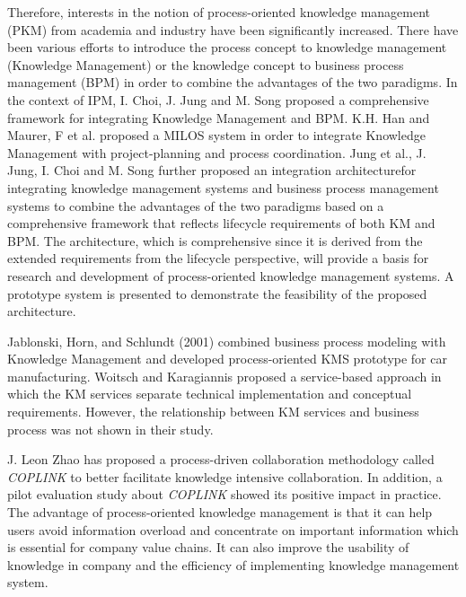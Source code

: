 \documentclass{elsarticle}
\begin{document}
\textrm{Therefore, interests in the notion of process-oriented knowledge
management (PKM) from academia and industry have been significantly
}\textrm{{increased}}\cite{jung2007integration}\textrm{.
There have been various efforts to introduce the process concept to
knowledge management (Knowledge Management) or the knowledge concept to
business process management (BPM) in order to combine the advantages of
the two
paradigms}\cite{berztiss2000knowledge,maurer98concept,maurer1999process,choi2004integrated}. In
the context of IPM, I. Choi, J. Jung and M. Song
proposed a comprehensive framework for
integrating Knowledge Management and
BPM\cite{choi2004integrated}.
\textrm{K.H. Han and }\textrm{{Maurer, F }}\textrm{et
al. proposed a MILOS system in order to integrate Knowledge Management
with project-planning and process
coordination}\cite{maurer2000merging}.
\textrm{Jung et al., J. Jung, I. Choi and M. Song further proposed an
}\textrm{{integration architecture}}for integrating knowledge
management systems  and business process management systems
 to combine the advantages of the two paradigms based on a
comprehensive framework that reflects lifecycle requirements of both
KM and BPM. The architecture, which is comprehensive
since it is derived from the extended requirements from the lifecycle
perspective, will provide a basis for research and development of
process-oriented knowledge management systems. A prototype system is
presented to demonstrate the feasibility of the proposed
architecture\cite{jung2007integration}.


\textrm{Jablonski, Horn, and Schlundt (2001) combined business process
modeling with Knowledge Management and developed process-oriented KMS
prototype for car
manufacturing}\cite{jablonski-process}.\textrm{{
}}\textrm{Woitsch and Karagiannis proposed a service-based
approach in which the KM services separate technical
implementation and conceptual requirements. However, the
}\textrm{relationship between KM services and
business process was not shown in their
study}\cite{woitsch2005process}.


\textrm{J. Leon Zhao has proposed a process-driven collaboration
methodology called }\textrm{\textit{COPLINK}}\textrm{ to better
facilitate knowledge intensive collaboration}\cite{zhao2006process}\textrm{. In addition, a pilot evaluation study about
}\textrm{\textit{COPLINK}}\textrm{ showed its positive impact in
practice}\textrm{. The advantage of
process-oriented knowledge management is that it can help users avoid
information overload and concentrate on important information which is
essential for company value
chains}\cite{millie2003knowledgescope}. \textrm{It can also improve the usability of knowledge in company and
the efficiency of implementing knowledge management
system}.\textrm{{
}}
\end{document}
